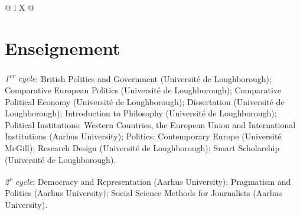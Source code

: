 \documentclass[letterpaper,fontsize=10.5pt]{scrartcl}
\begin{document}
\begin{longtblr}[entry=none,label=none]{@{} l X @{}}
\end{longtblr}

\section{Enseignement}
{}\textit{1\textsuperscript{er} cycle}: British Politics and Government (Université de Loughborough); Comparative European Politics (Université de Loughborough); Comparative Political Economy (Université de Loughborough); Dissertation (Université de Loughborough); Introduction to Philosophy (Université de Loughborough); Political Institutions: Western Countries, the European Union and International Institutions (Aarhus University); Politics: Contemporary Europe (Université McGill); Research Design (Université de Loughborough); Smart Scholarship (Université de Loughborough).\\
\hfill \break
{}
{}\textit{2\textsuperscript{e} cycle}: Democracy and Representation (Aarhus University); Pragmatism and Politics (Aarhus University); Social Science Methods for Journalists (Aarhus University).
\end{document}
